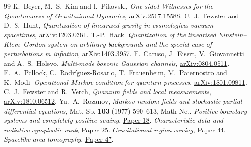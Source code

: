 \documentclass[11pt]{article}
\begin{document}
\begin{thebibliography}{99}
 K.~Beyer, M.~S.~Kim and I.~Pikovski, \emph{One-sided Witnesses for the Quantumness of Gravitational Dynamics}, \href{https://arxiv.org/abs/2507.15588}{arXiv:2507.15588}.
 C.~J.~Fewster and D.~S.~Hunt, \emph{Quantization of linearized gravity in cosmological vacuum spacetimes}, \href{https://arxiv.org/abs/1203.0261}{arXiv:1203.0261}.
 T.-P.~Hack, \emph{Quantization of the linearised Einstein--Klein--Gordon system on arbitrary backgrounds and the special case of perturbations in inflation}, \href{https://arxiv.org/abs/1403.3957}{arXiv:1403.3957}.
 F.~Caruso, J.~Eisert, V.~Giovannetti and A.~S.~Holevo, \emph{Multi-mode bosonic Gaussian channels}, \href{https://arxiv.org/abs/0804.0511}{arXiv:0804.0511}.
 F.~A.~Pollock, C.~Rodr\'iguez-Rosario, T.~Frauenheim, M.~Paternostro and K.~Modi, \emph{Operational Markov condition for quantum processes}, \href{https://arxiv.org/abs/1801.09811}{arXiv:1801.09811}.
 C.~J.~Fewster and R.~Verch, \emph{Quantum fields and local measurements}, \href{https://arxiv.org/abs/1810.06512}{arXiv:1810.06512}.
 Yu.~A.~Rozanov, \emph{Markov random fields and stochastic partial differential equations}, Mat. Sb. \textbf{103} (1977) 590--613, \href{https://www.mathnet.ru/eng/sm2931}{Math-Net}.
 \emph{Positive boundary systems and completely positive sewing}, \href{https://github.com/g3173028019-beep/ai-automated-quantum-gravity-research/tree/main/papers/18-positive-boundary-sewing}{Paper 18}.
 \emph{Characteristic data and radiative symplectic rank}, \href{https://github.com/g3173028019-beep/ai-automated-quantum-gravity-research/tree/main/papers/25-characteristic-data-symplectic-rank}{Paper 25}.
 \emph{Gravitational region sewing}, \href{https://github.com/g3173028019-beep/ai-automated-quantum-gravity-research/tree/main/papers/44-gravitational-region-sewing}{Paper 44}.
 \emph{Spacelike area tomography}, \href{https://github.com/g3173028019-beep/ai-automated-quantum-gravity-research/tree/main/papers/47-spacelike-area-tomography}{Paper 47}.
\end{thebibliography}
\end{document}
